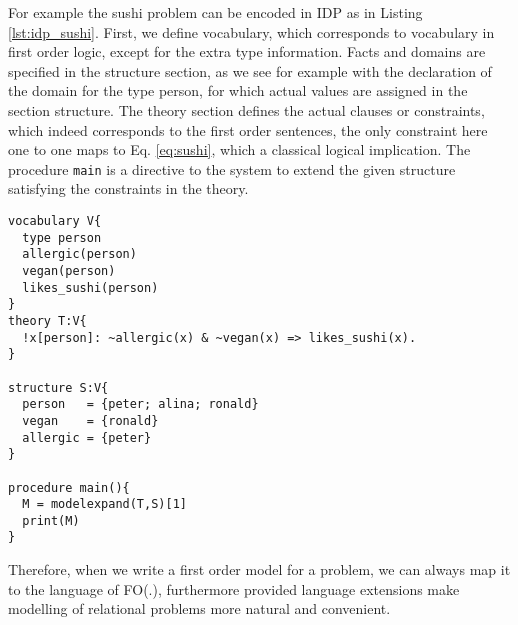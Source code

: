 For example the sushi problem can be encoded in IDP as in Listing \ref{lst:idp_sushi}. First, we define vocabulary, which corresponds to vocabulary in first order logic, except for the extra type information. Facts and domains are specified in the structure section, as we see for example with the declaration of the domain for the type person, for which actual values are assigned in the section structure. The theory section defines the actual clauses or constraints, which indeed corresponds to the first order sentences, the only constraint here one to one maps to Eq. \ref{eq:sushi}, which a classical logical implication. The procedure \texttt{main} is a directive to the system to extend the given structure satisfying the constraints in the theory.

\begin{minipage}{\linewidth}
\begin{lstlisting}[caption=Encoding sushi preferences problem, label=lst:idp_sushi,basicstyle=\ttfamily, basicstyle=\small]
vocabulary V{
  type person
  allergic(person)
  vegan(person)
  likes_sushi(person)
}
theory T:V{
  !x[person]: ~allergic(x) & ~vegan(x) => likes_sushi(x).
}

structure S:V{
  person   = {peter; alina; ronald}
  vegan    = {ronald}
  allergic = {peter}
}

procedure main(){
  M = modelexpand(T,S)[1]
  print(M)
}
\end{lstlisting}
\end{minipage}

Therefore, when we write a first order model for a problem, we can always map it to the language of FO(.), furthermore provided language extensions make modelling of relational problems more natural and convenient.

